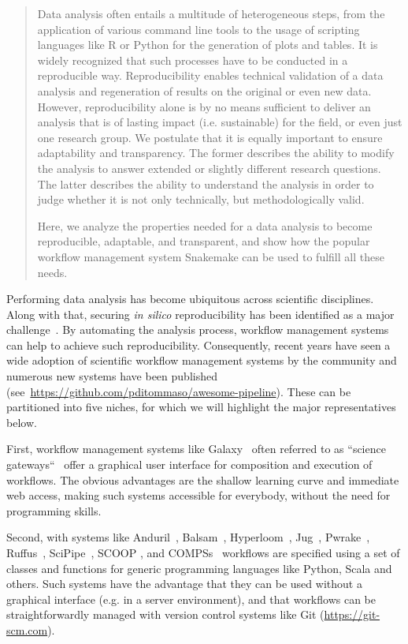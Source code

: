 \documentclass[parskip=half]{scrartcl}
\let\plainurl\url
\renewcommand{\url}[1]{\protect\plainurl{#1}}
\begin{document}
\begin{abstract}
	Data analysis often entails a multitude of heterogeneous steps, from the application of various command line tools to the usage of scripting languages like R or Python for the generation of plots and tables.
	It is widely recognized that such processes have to be conducted in a reproducible way.
	Reproducibility enables technical validation of a data analysis and regeneration of results on the original or even new data.
	However, reproducibility alone is by no means sufficient to deliver an analysis that is of lasting impact (i.e. sustainable) for the field, or even just one research group.
	We postulate that it is equally important to ensure adaptability and transparency.
	The former describes the ability to modify the analysis to answer extended or slightly different research questions.
	The latter describes the ability to understand the analysis in order to judge whether it is not only technically, but methodologically valid.

	Here, we analyze the properties needed for a data analysis to become reproducible, adaptable, and transparent, and show how the popular workflow management system Snakemake can be used to fulfill all these needs.
\end{abstract}

Performing data analysis has become ubiquitous across scientific disciplines.
Along with that, securing \emph{in silico} reproducibility has been identified as a major challenge~\parencite{Mesirov2010,Baker2016,Munaf__2017}.
By automating the analysis process, workflow management systems can help to achieve such reproducibility.
Consequently, recent years have seen a wide adoption of scientific workflow management systems by the community and numerous new systems have been published (see~\url{https://github.com/pditommaso/awesome-pipeline}).
These can be partitioned into five niches, for which we will highlight the major representatives below.

First, workflow management systems like Galaxy~\parencite{Afgan2018} often referred to as ``science gateways``~\parencite{Afgan2011-tv} offer a graphical user interface for composition and execution of workflows.
The obvious advantages are the shallow learning curve and immediate web access, making such systems accessible for everybody, without the need for programming skills.

Second, with systems like Anduril~\parencite{Cervera2019}, Balsam~\parencite{papka2018}, Hyperloom~\parencite{cima2018hyperloom}, Jug~\parencite{Coelho_2017}, Pwrake~\parencite{Tanaka_2010}, Ruffus~\parencite{Goodstadt2010}, SciPipe~\parencite{Lampa2019}, SCOOP \parencite{SCOOP_XSEDE2014}, and COMPSs~\parencite{Lordan_2013} workflows are specified using a set of classes and functions for generic programming languages like Python, Scala and others.
Such systems have the advantage that they can be used without a graphical interface (e.g. in a server environment), and that workflows can be straightforwardly managed with version control systems like Git (\url{https://git-scm.com}).
\end{document}
